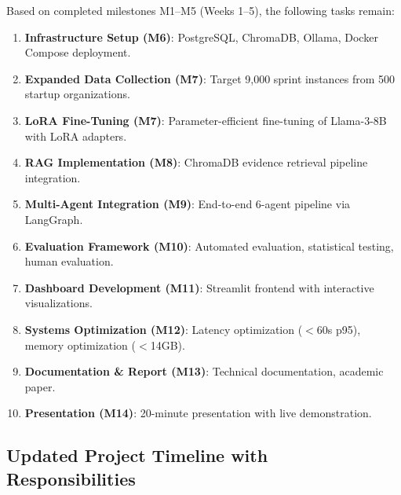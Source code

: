 \documentclass[journal]{IEEEtran}
\begin{document}
Based on completed milestones M1--M5 (Weeks 1--5), the following tasks remain:

\begin{enumerate}
    \item \textbf{Infrastructure Setup (M6)}: PostgreSQL, ChromaDB, Ollama, Docker Compose deployment.
    \item \textbf{Expanded Data Collection (M7)}: Target 9,000 sprint instances from 500 startup organizations.
    \item \textbf{LoRA Fine-Tuning (M7)}: Parameter-efficient fine-tuning of Llama-3-8B with LoRA adapters.
    \item \textbf{RAG Implementation (M8)}: ChromaDB evidence retrieval pipeline integration.
    \item \textbf{Multi-Agent Integration (M9)}: End-to-end 6-agent pipeline via LangGraph.
    \item \textbf{Evaluation Framework (M10)}: Automated evaluation, statistical testing, human evaluation.
    \item \textbf{Dashboard Development (M11)}: Streamlit frontend with interactive visualizations.
    \item \textbf{Systems Optimization (M12)}: Latency optimization ($<$60s p95), memory optimization ($<$14GB).
    \item \textbf{Documentation \& Report (M13)}: Technical documentation, academic paper.
    \item \textbf{Presentation (M14)}: 20-minute presentation with live demonstration.
\end{enumerate}

\subsection{Updated Project Timeline with Responsibilities}
\end{document}
